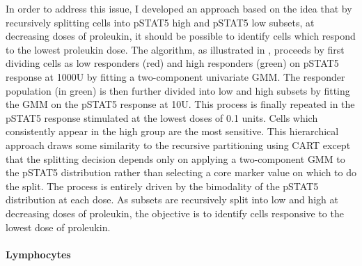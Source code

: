 In order to address this issue, I developed an approach based on the idea that by recursively splitting cells
into pSTAT5 high and pSTAT5 low subsets, at decreasing doses of proleukin,
it should be possible to identify cells which respond to the lowest proleukin dose.
The algorithm, as illustrated in , proceeds by first dividing cells as low responders (red) and high responders (green)
on pSTAT5 response at 1000U by fitting a two-component univariate \gls{GMM}.
The responder population (in green) is then further divided into low and high subsets by fitting the \gls{GMM} on the pSTAT5 response at 10U.
This process is finally repeated in the pSTAT5 response stimulated at the lowest doses of 0.1 units.
Cells which consistently appear in the high group are the most sensitive.
This hierarchical approach draws some similarity to the recursive partitioning using \gls{CART} except that the splitting decision depends only
on applying a two-component \gls{GMM} to the pSTAT5 distribution rather than selecting a core marker value on which to do the split.
The process is entirely driven by the bimodality of the pSTAT5 distribution at each dose.
As subsets are recursively split into low and high at decreasing doses of proleukin, the objective is to identify cells responsive to the lowest dose of proleukin.

\paragraph{Lymphocytes}

